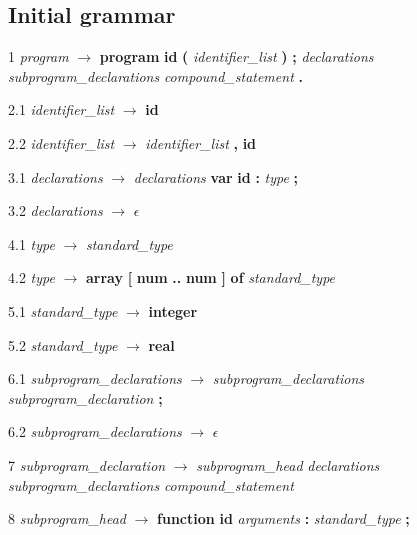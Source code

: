 
% 
\subsection*{Initial grammar}
1    \emph{program} $\rightarrow$ \textbf{program} \textbf{id} \textbf{(} \emph{identifier\_list} \textbf{)} \textbf{;} \emph{declarations} \emph{subprogram\_declarations} \emph{compound\_statement} \textbf{.}


2.1  \emph{identifier\_list} $\rightarrow$ \textbf{id}

2.2  \emph{identifier\_list} $\rightarrow$ \emph{identifier\_list} \textbf{,} \textbf{id}

3.1  \emph{declarations} $\rightarrow$ \emph{declarations} \textbf{var} \textbf{id} \textbf{:} \emph{type} \textbf{;}

3.2  \emph{declarations} $\rightarrow$ $\epsilon$

4.1  \emph{type} $\rightarrow$ \emph{standard\_type}

4.2  \emph{type} $\rightarrow$ \textbf{array} \textbf{[} \textbf{num} \textbf{..} \textbf{num} \textbf{]} \textbf{of} \emph{standard\_type}

5.1  \emph{standard\_type} $\rightarrow$ \textbf{integer}

5.2  \emph{standard\_type} $\rightarrow$ \textbf{real}

6.1  \emph{subprogram\_declarations} $\rightarrow$ \emph{subprogram\_declarations} \emph{subprogram\_declaration} \textbf{;}

6.2  \emph{subprogram\_declarations} $\rightarrow$ $\epsilon$

7    \emph{subprogram\_declaration} $\rightarrow$ \emph{subprogram\_head} \emph{declarations} \emph{subprogram\_declarations} \emph{compound\_statement}

8    \emph{subprogram\_head} $\rightarrow$ \textbf{function} \textbf{id} \emph{arguments} \textbf{:} \emph{standard\_type} \textbf{;}

